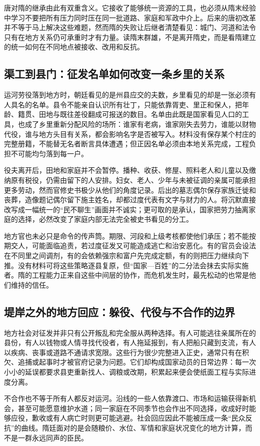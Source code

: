 唐对隋的继承由此有双重含义。它接收了能够统一资源的工具，也必须从隋末经验中学习不要把所有压力同时压在同一批道路、家庭和军政中介上。后来的唐初改革并不等于马上解决这些难题，然而隋的失败让后继者清楚看见：城门、河道和法令只有在地方关系仍可承重时才有力量。读隋末群雄，不是离开隋史，而是看隋建立的统一如何在不同地点被接收、改用和反抗。

\subsection{渠工到县门：征发名单如何改变一条乡里的关系}
运河劳役落到地方时，朝廷看见的是州县应交的夫数，乡里看见的却是一张必须有人具名的名单。县令不能亲自认识所有壮丁，只能依靠胥吏、里正和保人，把年龄、籍贯、田地与既往差役翻成可报送的数目。名单由此既是国家看见人口的工具，也成了乡里重新分配风险的场所：谁家有老病，谁家刚失去劳力，谁能以财物代役，谁与地方头目有关系，都会影响名字是否被写入。材料没有保存某个村庄的完整册籍，不能替无名者断言具体遭遇；但正因名单必须由本地关系完成，工程负担不可能均匀落到每一户。

役夫离开后，田地和家庭并不会暂停。播种、收获、修屋、照料老人和儿童以及缴纳原有税役，仍需由留下的人安排。妇女、老人、少年与未被征调的亲属可能承担更多劳动，然而官修史书极少从他们的角度记录。后出的墓志偶尔保存家族迁徙和丧葬，造像题记偶尔留下施主姓名，却都过度代表有文字与财力的人。将沉默直接改写成一幅统一的“民不聊生”画面并不诚实；更可取的是承认，国家把劳力抽离家庭的选择，必然改变了家庭内部无法完全被史书看见的分工。

地方官也未必只是命令的传声筒。期限、河段和上级考核都使他们承压；若不能按期交人，可能面临追责，若过度征发又可能造成逃亡和治安恶化。有的官员会设法在不同里之间调剂，有的会依赖强宗和富户先完成定额，有的则把压力继续向下推。没有材料可将这些策略逐县复原，但“国家—百姓”的二分法会抹去实际实施者。隋的工程能力正来自这些中间层的协作，而危机发生时，最先松动的也常是他们维持的信任。

\subsection{堤岸之外的地方回应：躲役、代役与不合作的边界}
地方社会对征发并非只有公开叛乱和完全服从两种选择。有人可能逃往亲属所在的县份，有人以钱物或人情寻找代役者，有人拖延报到，有人把船只藏到支流，有人以疾病、丧事或道路不通请求宽限。这些行为很少完整进入正史，通常只有在积欠、追捕或起事时才被官府记录为问题。它们却构成国家动员的日常边界：每一次小小的延误都要求县吏重新找人、调粮或改期，积累起来便会使纸面工程与实际进度分离。

不合作也不等于所有人都反对运河。沿线的一些人依靠渡口、市场和运输获得新机会，甚至可能愿意维护水道；同一家庭在不同季节也会作出不同选择，收成好时能够应役，歉收或有人病亡时则更可能逃避。社会回应因此不能被压成一条“民众反抗”的曲线。隋廷面对的是会随粮价、水位、军情和家庭状况变化的地方计算，而不是一群永远同声的臣民。

